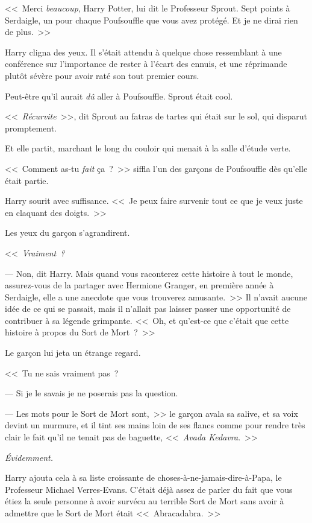 <<~Merci \emph{beaucoup}, Harry Potter, lui dit le Professeur Sprout. Sept points à Serdaigle, un pour chaque Poufsouffle que vous avez protégé. Et je ne dirai rien de plus.~>>

Harry cligna des yeux. Il s'était attendu à quelque chose ressemblant à une conférence sur l'importance de rester à l'écart des ennuis, et une réprimande plutôt sévère pour avoir raté son tout premier cours.

Peut-être qu'il aurait \emph{dû} aller à Poufsouffle. Sprout était cool.

<<~\emph{Récurvite}~>>, dit Sprout au fatras de tartes qui était sur le sol, qui disparut promptement.

Et elle partit, marchant le long du couloir qui menait à la salle d'étude verte.

<<~Comment as-tu \emph{fait} ça~?~>> siffla l'un des garçons de Poufsouffle dès qu'elle était partie.

Harry sourit avec suffisance. <<~Je peux faire survenir tout ce que je veux juste en claquant des doigts.~>>

Les yeux du garçon s'agrandirent.

<<~\emph{Vraiment~?}

--- Non, dit Harry. Mais quand vous raconterez cette histoire à tout le monde, assurez-vous de la partager avec Hermione Granger, en première année à Serdaigle, elle a une anecdote que vous trouverez amusante.~>> Il n'avait aucune idée de ce qui se passait, mais il n'allait pas laisser passer une opportunité de contribuer à sa légende grimpante. <<~Oh, et qu'est-ce que c'était que cette histoire à propos du Sort de Mort~?~>>

Le garçon lui jeta un étrange regard.

<<~Tu ne sais vraiment pas~?

--- Si je le savais je ne poserais pas la question.

--- Les mots pour le Sort de Mort sont,~>> le garçon avala sa salive, et sa voix devint un murmure, et il tint ses mains loin de ses flancs comme pour rendre très clair le fait qu'il ne tenait pas de baguette, <<~\emph{Avada Kedavra}.~>>

\emph{Évidemment.}

Harry ajouta cela à sa liste croissante de choses-à-ne-jamais-dire-à-Papa, le Professeur Michael Verres-Evans. C'était déjà assez de parler du fait que vous étiez la seule personne à avoir survécu au terrible Sort de Mort sans avoir à admettre que le Sort de Mort était <<~Abracadabra.~>>

